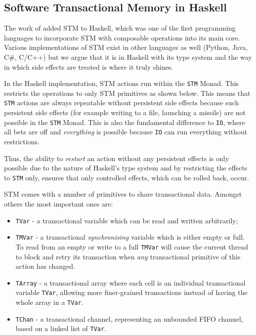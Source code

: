 \subsection{Software Transactional Memory in Haskell}
The work of \cite{harris_composable_2005, harris_transactional_2006} added STM to Haskell, which was one of the first programming languages to incorporate STM with composable operations into its main core. Various implementations of STM exist in other languages as well (Python, Java, C\#, C/C++) but we argue that it is in Haskell with its type system and the way in which side effects are treated is where it truly shines.

In the Haskell implementation, STM actions run within the \texttt{STM} Monad. This restricts the operations to only STM primitives as shown below. This means that \texttt{STM} actions are always repeatable without persistent side effects because such persistent side effects (for example writing to a file, launching a missile) are not possible in the \texttt{STM} Monad. This is also the fundamental difference to \texttt{IO}, where all bets are off and \textit{everything} is possible because \texttt{IO} can run everything without restrictions.

Thus, the ability to \textit{restart} an action without any persistent effects is only possible due to the nature of Haskell's type system and by restricting the effects to \texttt{STM} only, ensures that only controlled effects, which can be rolled back, occur.

STM comes with a number of primitives to share transactional data. Amongst others the most important ones are:

\begin{itemize}
	\item \texttt{TVar} - a transactional variable which can be read and written arbitrarily;
	
	\item \texttt{TMVar} - a transactional \textit{synchronising} variable which is either empty or full. To read from an empty or write to a full \texttt{TMVar} will cause the current thread to block and retry its transaction when \textit{any} transactional primitive of this action has changed.
	
	\item \texttt{TArray} - a transactional array where each cell is an individual transactional variable \texttt{TVar}, allowing more finer-grained transactions instead of having the whole array in a \texttt{TVar}.
	
	\item \texttt{TChan} - a transactional channel, representing an unbounded FIFO channel, based on a linked list of \texttt{TVar}.
\end{itemize}

